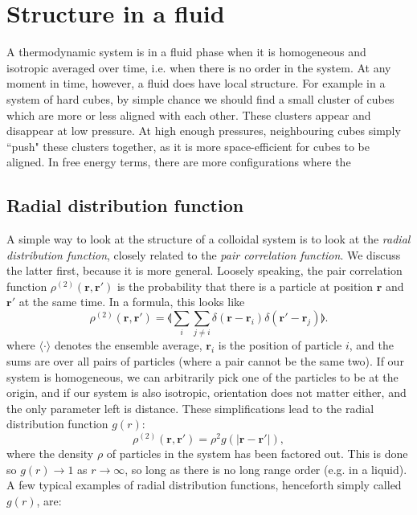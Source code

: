 \documentclass[thesis]{subfiles}
\begin{document}
\section{Structure in a fluid}

A thermodynamic system is in a fluid phase when it is homogeneous and isotropic averaged over time, i.e. when there is no order in the system. At any moment in time, however, a fluid does have local structure. For example in a system of hard cubes, by simple chance we should find a small cluster of cubes which are more or less aligned with each other. These clusters appear and disappear at low pressure. At high enough pressures, neighbouring cubes simply ``push" these clusters together, as it is more space-efficient for cubes to be aligned. In free energy terms, there are more configurations where the 

\subsection{Radial distribution function}

A simple way to look at the structure of a colloidal system is to look at the \emph{radial distribution function}, closely related to the \emph{pair correlation function}. We discuss the latter first, because it is more general. Loosely speaking, the pair correlation function $\rho^{(2)}(\bm r, \bm r')$ is the probability that there is a particle at position $\bm r$ and $\bm r'$ at the same time. In a formula, this looks like 
\begin{equation}
	\rho^{(2)}(\bm r, \bm r') = \llangle \sum_i \sum_{j \neq i} \delta(\bm r - \bm r_i) \delta(\bm r' - \bm r_j) \rrangle.
\end{equation}
where $\langle \cdot \rangle$ denotes the ensemble average, $\bm r_i$ is the position of particle $i$, and the sums are over all pairs of particles (where a pair cannot be the same two).
If our system is homogeneous, we can arbitrarily pick one of the particles to be at the origin, and if our system is also isotropic, orientation does not matter either, and the only parameter left is distance. These simplifications lead to the radial distribution function $g(r):$
\begin{equation}
	\rho^{(2)}(\bm r, \bm r') = \rho^2 g(|\bm r - \bm r'|),
\end{equation}
where the density $\rho$ of particles in the system has been factored out. This is done so $g(r) \rightarrow 1$ as $r \rightarrow \infty$, so long as there is no long range order (e.g. in a liquid). A few typical examples of radial distribution functions, henceforth simply called $g(r)$, are:
\end{document}
